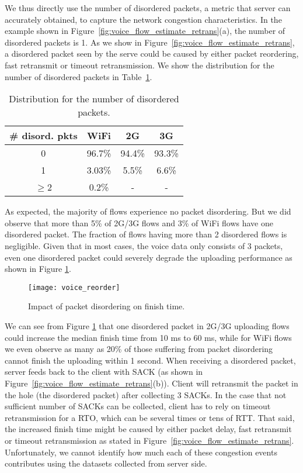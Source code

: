 We thus directly use the number of disordered packets, a metric that server can accurately obtained, to capture the network congestion characteristics. In the example shown in Figure~\ref{fig:voice_flow_estimate_retrans}(a), the number of disordered packets is 1. As we show in Figure~\ref{fig:voice_flow_estimate_retrans}, a disordered packet seen by the serve could be caused by either packet reordering, fast retransmit or timeout retransmission. We show the distribution for the number of disordered packets in Table~\ref{tab:voice_reorder}.

\begin{table}[th]
\caption{Distribution for the number of disordered packets.}
\label{tab:voice_reorder}
\centering
\renewcommand{\arraystretch}{1.1}
\begin{tabular}{c|c|c|c}
\toprule
\# disord. pkts & WiFi & 2G & 3G \\
\hline
0 & 96.7\% & 94.4\% & 93.3\% \\
1 & 3.03\% & 5.5\% & 6.6\% \\
$\ge$2 & 0.2\% & - & - \\
\bottomrule
\end{tabular}
\end{table}

As expected, the majority of flows experience no packet disordering. But we did observe that more than 5\% of 2G/3G flows and 3\% of WiFi flows have one disordered packet. The fraction of flows having more than 2 disordered flows is negligible. Given that in most cases, the voice data only consists of 3 packets, even one disordered packet could severely degrade the uploading performance as shown in Figure \ref{fig:voice_reorder}.


\begin{figure}[th]
\centering
	\texttt{[image: voice\_reorder]}
\caption{Impact of packet disordering on finish time.}
\label{fig:voice_reorder}
\end{figure}

We can see from Figure \ref{fig:voice_reorder} that one disordered packet in 2G/3G uploading flows could increase the median finish time from 10 ms to 60 ms, while for WiFi flows we even observe as many as 20\% of those suffering from packet disordering cannot finish the uploading within 1 second. When receiving a disordered packet, server feeds back to the client with SACK (as shown in Figure~\ref{fig:voice_flow_estimate_retrans}(b)). Client will retransmit the packet in the hole (\ie the disordered packet) after collecting 3 SACKs. In the case that not sufficient number of SACKs can be collected, client has to rely on timeout retransmission for a RTO, which can be several times or tens of RTT. That said, the increased finish time might be caused by either packet delay, fast retransmit or timeout retransmission as stated in Figure~\ref{fig:voice_flow_estimate_retrans}. Unfortunately, we cannot identify how much each of these congestion events contributes using the datasets collected from server side.

